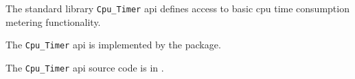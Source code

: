 
The standard library {\tt Cpu\_Timer} api defines access to basic cpu time consumption 
metering functionality.

The {\tt Cpu\_Timer} api is implemented by the  package.

The {\tt Cpu\_Timer} api source code is in .
